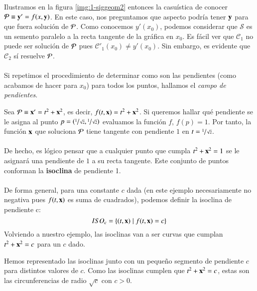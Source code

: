 Ilustramos en la figura \ref{img:1-siggeom2} entonces la casuística de conocer $\P \equiv \mbf{y'} = f(x,\mbf{y})$. En este caso, nos preguntamos que aspecto podría tener $\mbf{y}$ para que fuera solución de $\P$. Como conocemos $y'(x_0)$, podemos considerar que $\mathcal{S}$ es un semento paralelo a la recta tangente de la gráfica en $x_0$. Es fácil ver que $\mathcal{C}_1$ no puede ser solución de $\P$ pues $\mathcal{C}'_1(x_0) \neq y'(x_0)$. Sin embargo, es evidente que $\mathcal{C}_2$ sí resuelve $\P$.\\\\
Si repetimos el procedimiento de determinar como son las pendientes (como acabamos de hacer para $x_0$) para todos los puntos, hallamos el \textit{campo de pendientes}.

\begin{eg}\label{eg:campo-pendientes}
    Sea $\P \equiv \mbf{x'} = t^2 + \mbf{x}^2$, es decir, $f(t, \mbf{x}) = t^2 + \mbf{x}^2$. Si queremos hallar qué pendiente se le asigna al punto $p = (\sfrac{1}{\sqrt{2}},\sfrac{1}{\sqrt{2}})$ evaluamos la función $f$, $f(p) = 1$. Por tanto, la función $\mbf{x}$ que soluciona $\P$ tiene tangente con pendiente $1$ en $t = \sfrac{1}{\sqrt{2}}$.\\\\
    De hecho, es lógico pensar que a cualquier punto que cumpla $t^2 + \mbf{x}^2 = 1$ se le asignará una pendiente de $1$ a su recta tangente. Este conjunto de puntos conforman la \textbf{isoclina} de pendiente 1.\\\\
    De forma general, para una constante $c$ dada (en este ejemplo necesariamente no negativa pues $f(t, \mbf{x})$ es suma de cuadrados), podemos definir la isoclina de pendiente c:
    $$
    ISO_c = \left\{(t, \mbf{x}) \mid f(t, \mbf{x}) = c\right\}
    $$
    Volviendo a nuestro ejemplo, las isoclinas van a ser curvas que cumplan $t^2 + \mbf{x}^2 = c$ para un $c$ dado.\\
    \begin{minipage}[c]{0.3\linewidth}
      \begin{center}
      \end{center}
    \end{minipage}\hfill
    \begin{minipage}[c]{0.65\textwidth}
        Hemos representado las isoclinas junto con un pequeño segmento de pendiente $c$ para distintos valores de $c$. Como las isoclinas cumplen que $t^2 + \mbf{x}^2 = c$, estas son las circunferencias de radio $\sqrt{c}$ con $c > 0$.\\

\end{minipage}
\end{eg}
